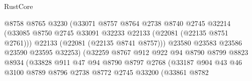 \begin{lexlean}{RustCore}
\begin{coremodule}
                                        @8758
                                        @8765
                                        @3230
                                        (@33071
                                          @8757
                                          @8764
                                          @2738
                                          @8740
                                          @2745
                                          @32214
                                          (@33085
                                            @8750
                                            @2745
                                            @33091
                                            @32233
                                            @22133
                                            (@22081 (@22135 @8751 @2761)))
                                          @22133
                                          (@22081 (@22135 @8741 @8757)))
                                        @23580
                                        @23583
                                        @23586
                                        @23590
                                        @23595
                                        @32253)
                                      (@32259
                                        @8767
                                        @912
                                        @922
                                        @94
                                        @8790
                                        @8799
                                        @8823
                                        @8934
                                        (@33828
                                          @911
                                          @47
                                          @94
                                          @8790
                                          @8797
                                          @2768
                                          (@33187
                                            @904
                                            @43
                                            @46
                                            @3100
                                            @8789
                                            @8796
                                            @2738
                                            @8772
                                            @2745
                                            @33200
                                            (@33861
                                              @8782

\end{coremodule}
\end{lexlean}
